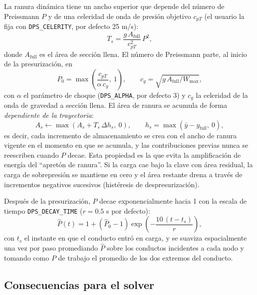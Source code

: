 \documentclass[11pt,a4paper]{article}
\begin{document}
La ranura dinámica tiene un ancho superior que depende del número de
Preissmann $P$ y de una celeridad de onda de presión objetivo $c_{pT}$
(el usuario la fija con \texttt{DPS\_CELERITY}, por defecto 25 m/s):
\begin{equation}
  T_s = \frac{g\,A_{\mathrm{full}}}{c_{pT}^{2}}\,P^{2},
\end{equation}
donde $A_{\mathrm{full}}$ es el área de sección llena. El número de Preissmann
parte, al inicio de la presurización, en
\begin{equation}
  P_{0} = \max\!\left(\frac{c_{pT}}{\alpha\,c_g},\ 1\right),
  \qquad c_g = \sqrt{g\,A_{\mathrm{full}}/W_{\max}},
\end{equation}
con $\alpha$ el parámetro de choque (\texttt{DPS\_ALPHA}, por defecto 3) y
$c_g$ la celeridad de la onda de gravedad a sección llena. El área de ranura se
acumula de forma \emph{dependiente de la trayectoria}:
\begin{equation}
  A_s \leftarrow \max\!\left(A_s + T_s\,\Delta h_s,\ 0\right),
  \qquad h_s = \max(\bar y - y_{\mathrm{full}},\ 0),
\end{equation}
es decir, cada incremento de almacenamiento se crea con el ancho de ranura
vigente en el momento en que se acumula, y las contribuciones previas nunca se
reescriben cuando $P$ decae. Esta propiedad es la que evita la amplificación de
energía del ``apretón de ranura''. Si la carga cae bajo la clave con área
residual, la carga de sobrepresión se mantiene en cero y el área restante
drena a través de incrementos negativos sucesivos (histéresis de
despresurización).

Después de la presurización, $P$ decae exponencialmente hacia 1 con la escala
de tiempo \texttt{DPS\_DECAY\_TIME} ($r = 0.5$ s por defecto):
\begin{equation}
  \hat P(t) = 1 + (\hat P_0 - 1)\exp\!\left(-\frac{10\,(t - t_s)}{r}\right),
\end{equation}
con $t_s$ el instante en que el conducto entró en carga, y se suaviza
espacialmente una vez por paso promediando $\hat P$ sobre los conductos
incidentes a cada nodo y tomando como $P$ de trabajo el promedio de los dos
extremos del conducto.

\subsection{Consecuencias para el solver}
\end{document}
